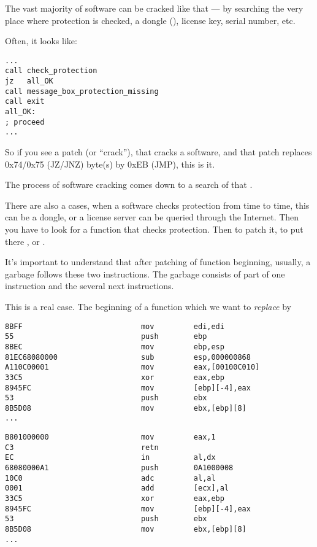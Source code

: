 \myindex{\SoftwareCracking}

The vast majority of software can be cracked like that --- by searching the very place where protection is checked, a dongle
(), license key, serial number, etc.

Often, it looks like:

\begin{lstlisting}[style=customasmx86]
...
call check_protection
jz   all_OK
call message_box_protection_missing
call exit
all_OK:
; proceed
...
\end{lstlisting}

So if you see a patch (or ``crack''), that cracks a software, and that patch replaces 0x74/0x75 (JZ/JNZ) byte(s) by 0xEB (JMP),
this is it.

The process of software cracking comes down to a search of that .

\myhrule{}

There are also a cases, when a software checks protection from time to time, this can be a dongle, or a license server
can be queried through the Internet.
Then you have to look for a function that checks protection.
Then to patch it, to put there , or .

It's important to understand that after patching of function beginning, usually, a garbage follows these two instructions.
The garbage consists of part of one instruction and the several next instructions.

This is a real case.
The beginning of a function which we want to \emph{replace} by 

\begin{lstlisting}[style=customasmx86,caption=Before]
8BFF                           mov         edi,edi
55                             push        ebp
8BEC                           mov         ebp,esp
81EC68080000                   sub         esp,000000868
A110C00001                     mov         eax,[00100C010]
33C5                           xor         eax,ebp
8945FC                         mov         [ebp][-4],eax
53                             push        ebx
8B5D08                         mov         ebx,[ebp][8]
...
\end{lstlisting}

\begin{lstlisting}[style=customasmx86,caption=After]
B801000000                     mov         eax,1
C3                             retn
EC                             in          al,dx
68080000A1                     push        0A1000008
10C0                           adc         al,al
0001                           add         [ecx],al
33C5                           xor         eax,ebp
8945FC                         mov         [ebp][-4],eax
53                             push        ebx
8B5D08                         mov         ebx,[ebp][8]
...
\end{lstlisting}

